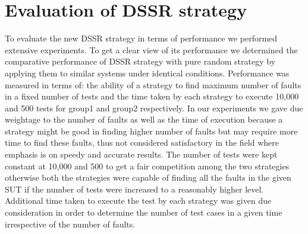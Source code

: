 
\section{Evaluation of DSSR strategy}
To evaluate the new DSSR strategy in terms of performance we performed extensive experiments. To get a clear view of its performance we determined the comparative performance of DSSR strategy with pure random strategy by applying them to similar systems under identical conditions. Performance was measured in terms of: the ability of a strategy to find maximum number of faults in a fixed number of tests and the time taken by each strategy to execute 10,000 and 500 tests for group1 and group2 respectively. In our experiments we gave due weightage to the number of faults as well as the time of execution because a strategy might be good in finding higher number of faults but may require more time to find these faults, thus not considered satisfactory in the field where emphasis is on speedy and accurate results. The number of tests were kept constant at 10,000 and 500 to get a fair competition among the two strategies otherwise both the strategies were capable of finding all the faults in the given SUT if the number of tests were increased to a reasonably higher level. Additional time taken to execute the test by each strategy was given due consideration in order to determine the number of test cases in a given time irrespective of the number of faults. 